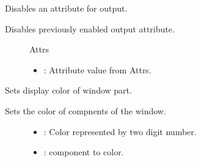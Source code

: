 \documentclass[letterpaper,10pt,english]{sphinxmanual}
\begin{document}
\begin{fulllineitems}
\begin{fulllineitems}
\begin{description}
\end{description}


\end{fulllineitems}


\begin{fulllineitems}
\label{\detokenize{index:_CPPv2N7ostendo6Window7AttrOffEi}}%
\pysigstartmultiline
{}\label{\detokenize{index:Pessumclassostendo_1_1Window_1aa2e4c33da0d446f52e7c34d1ec781bbc}}%
\pysigstopmultiline
Disables an attribute for output. 

Disables previously enabled output attribute. \begin{description}
\item[{}] \leavevmode
Attrs 

\item[{}] \leavevmode\begin{itemize}
\item {} 
: Attribute value from Attrs. 

\end{itemize}

\end{description}


\end{fulllineitems}


\begin{fulllineitems}
\label{\detokenize{index:_CPPv2N7ostendo6Window8SetColorEii}}%
\pysigstartmultiline
{}\label{\detokenize{index:Pessumclassostendo_1_1Window_1adde21c9878a3d8dd0d94ae68d58040cb}}%
\pysigstopmultiline
Sets display color of window part. 

Sets the color of compnents of the window. \begin{description}
\item[{}] \leavevmode\begin{itemize}
\item {} 
: Color represented by two digit number. 

\item {} 
: {\hyperref[\detokenize{index:Pessumclassostendo_1_1Window}]{}} component to color. 


\end{itemize}
\end{description}
\end{fulllineitems}
\end{fulllineitems}
\end{document}
